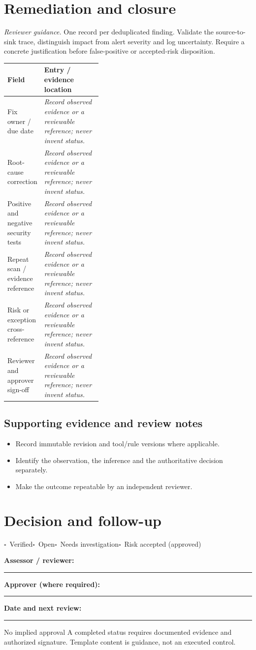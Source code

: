 \documentclass[10pt,letterpaper]{article}
\newcommand{\checkbox}{\(\square\)}
\newcommand{\blankline}{\noindent\rule{\linewidth}{0.35pt}\par\vspace{4pt}}
\begin{document}
\section{Remediation and closure}
\textit{Reviewer guidance.} One record per deduplicated finding. Validate the source-to-sink trace, distinguish impact from alert severity and log uncertainty. Require a concrete justification before false-positive or accepted-risk disposition.
\begin{tabularx}{\linewidth}{@{}p{0.38\linewidth}Y@{}}
\toprule Field & Entry / evidence location\\\midrule
Fix owner / due date & \textit{Record observed evidence or a reviewable reference; never invent status.}\\[1.0em]
\midrule
Root-cause correction & \textit{Record observed evidence or a reviewable reference; never invent status.}\\[1.0em]
\midrule
Positive and negative security tests & \textit{Record observed evidence or a reviewable reference; never invent status.}\\[1.0em]
\midrule
Repeat scan / evidence reference & \textit{Record observed evidence or a reviewable reference; never invent status.}\\[1.0em]
\midrule
Risk or exception cross-reference & \textit{Record observed evidence or a reviewable reference; never invent status.}\\[1.0em]
\midrule
Reviewer and approver sign-off & \textit{Record observed evidence or a reviewable reference; never invent status.}\\[1.0em]
\midrule
\end{tabularx}
\subsection{Supporting evidence and review notes}
\begin{itemize}
\item Record immutable revision and tool/rule versions where applicable.
\item Identify the observation, the inference and the authoritative decision separately.
\item Make the outcome repeatable by an independent reviewer.
\end{itemize}
\clearpage
\section{Decision and follow-up}
\noindent\checkbox\ Verified\quad\checkbox\ Open\quad\checkbox\ Needs investigation\quad\checkbox\ Risk accepted (approved)\par
\noindent\textbf{Assessor / reviewer:}\par\blankline\textbf{Approver (where required):}\par\blankline\textbf{Date and next review:}\par\blankline
\begin{warnbox}{No implied approval}
A completed status requires documented evidence and authorized signature. Template content is guidance, not an executed control.\end{warnbox}
\end{document}
